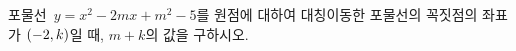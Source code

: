 포물선~$y=x^2-2mx+m^2-5$를 원점에 대하여 대칭이동한 포물선의 꼭짓점의 좌표가 $(-2{,}\mkern3mu\mathopen{}k)$일 때, $m+k$의 값을 구하시오. 
